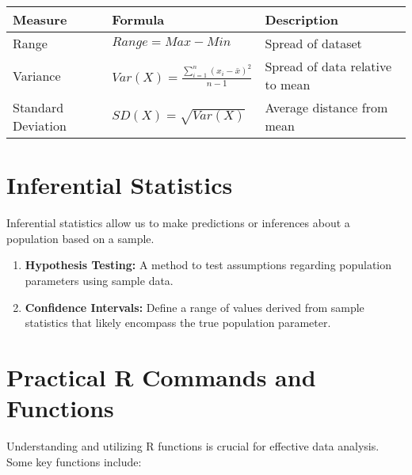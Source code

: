 \documentclass[
  letterpaper,
  DIV=11,
  numbers=noendperiod]{scrreprt}
\providecommand{\tightlist}{%
  \setlength{\itemsep}{0pt}\setlength{\parskip}{0pt}}
\begin{document}
\begin{longtable}[]{@{}
  >{\raggedright\arraybackslash}p{}
  >{\raggedright\arraybackslash}p{}
  >{\raggedright\arraybackslash}p{}@{}}
\toprule\noalign{}
\begin{minipage}[b]{\linewidth}\raggedright
Measure
\end{minipage} & \begin{minipage}[b]{\linewidth}\raggedright
Formula
\end{minipage} & \begin{minipage}[b]{\linewidth}\raggedright
Description
\end{minipage} \\
\midrule\noalign{}
\endhead
\bottomrule\noalign{}
\endlastfoot
Range & \(Range = Max - Min\) & Spread of dataset \\
Variance & \(Var(X) = \frac{\sum_{i=1}^{n} (x_i - \bar{x})^2}{n - 1}\) &
Spread of data relative to mean \\
Standard Deviation & \(SD(X) = \sqrt{Var(X)}\) & Average distance from
mean \\
\end{longtable}

\section{Inferential Statistics}\label{inferential-statistics}

Inferential statistics allow us to make predictions or inferences about
a population based on a sample.

\begin{enumerate}
\def\labelenumi{\arabic{enumi}.}
\tightlist
\item
  \textbf{Hypothesis Testing:} A method to test assumptions regarding
  population parameters using sample data.
\item
  \textbf{Confidence Intervals:} Define a range of values derived from
  sample statistics that likely encompass the true population parameter.
\end{enumerate}

\section{Practical R Commands and
Functions}\label{practical-r-commands-and-functions}

Understanding and utilizing R functions is crucial for effective data
analysis. Some key functions include:
\end{document}
